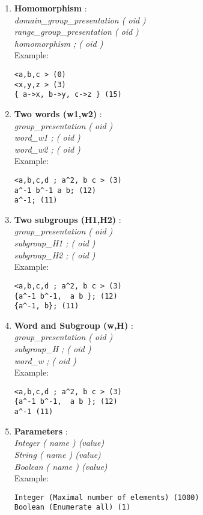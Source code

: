 \documentclass[12pt]{article}
\begin{document}
\begin{enumerate}
\begin{verbatim}
{ a->b, b->c, c->d, d->a } (15)
\end{verbatim}
\item \textbf{Homomorphism} : \\
 \emph{ domain\_group\_presentation ( oid ) } \\
 \emph{ range\_group\_presentation ( oid ) } \\
\emph{  homomorphism ; ( oid ) } \\
Example:
\begin{verbatim}
<a,b,c > (0)
<x,y,z > (3)
{ a->x, b->y, c->z } (15)
\end{verbatim}
\item \textbf{Two words (w1,w2)} :  \\
 \emph{ group\_presentation ( oid ) } \\
\emph{  word\_w1 ; ( oid ) } \\
\emph{  word\_w2 ; ( oid ) } \\
Example:
\begin{verbatim}
<a,b,c,d ; a^2, b c > (3)
a^-1 b^-1 a b; (12)
a^-1; (11)
\end{verbatim}
\item \textbf{Two subgroups (H1,H2)} :  \\
 \emph{ group\_presentation ( oid ) } \\
\emph{  subgroup\_H1 ; ( oid ) } \\
\emph{  subgroup\_H2 ; ( oid ) } \\
Example:
\begin{verbatim}
<a,b,c,d ; a^2, b c > (3)
{a^-1 b^-1,  a b }; (12)
{a^-1, b}; (11)
\end{verbatim}
\item \textbf{Word and Subgroup (w,H)} :  \\
 \emph{ group\_presentation ( oid ) } \\
\emph{  subgroup\_H ; ( oid ) } \\
\emph{  word\_w ; ( oid ) } \\
Example:
\begin{verbatim}
<a,b,c,d ; a^2, b c > (3)
{a^-1 b^-1,  a b }; (12)
a^-1 (11)
\end{verbatim}
\item \textbf{Parameters} : \\
\emph{Integer ( name ) (value) } \\
\emph{String ( name ) (value) } \\
\emph{Boolean ( name ) (value) } \\
Example:
\begin{verbatim}
Integer (Maximal number of elements) (1000)
Boolean (Enumerate all) (1)
\end{verbatim}
\end{enumerate}
\end{document}
